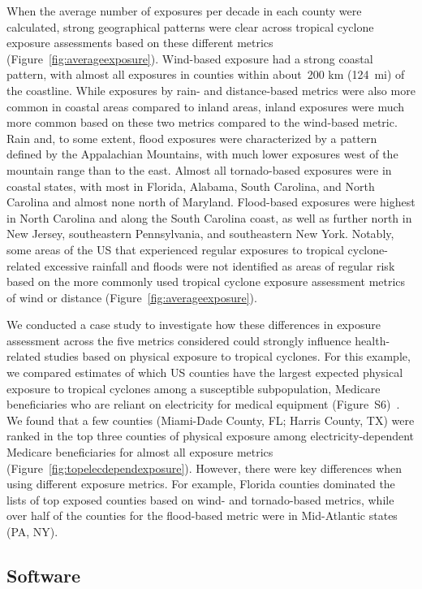 When the average number of exposures per decade in each county were calculated,
strong geographical patterns were clear across tropical cyclone exposure
assessments based on these different metrics
(Figure~\ref{fig:averageexposure}). Wind-based exposure had a strong coastal
pattern, with almost all exposures in counties within about~200
\si{\kilo\metre} (124~mi) of the coastline. While exposures by rain- and
distance-based metrics were also more common in coastal areas compared to
inland areas, inland exposures were much more common based on these two metrics
compared to the wind-based metric. Rain and, to some extent, flood exposures
were characterized by a pattern defined by the Appalachian Mountains, with much
lower exposures west of the mountain range than to the east. Almost all
tornado-based exposures were in coastal states, with most in Florida, Alabama,
South Carolina, and North Carolina and almost none north of Maryland.
Flood-based exposures were highest in North Carolina and along the South
Carolina coast, as well as further north in New Jersey, southeastern
Pennsylvania, and southeastern New York. Notably, some areas of the \ac{US}
that experienced regular exposures to tropical cyclone-related excessive
rainfall and floods were not identified as areas of regular risk based on the
more commonly used tropical cyclone exposure assessment metrics of wind or
distance (Figure~\ref{fig:averageexposure}). 

We conducted a case study to investigate how these differences in exposure
assessment across the five metrics considered could strongly influence
health-related studies based on physical exposure to tropical cyclones. For
this example, we compared estimates of which \ac{US} counties have the largest
expected physical exposure to tropical cyclones among a susceptible
subpopulation, Medicare beneficiaries who are reliant on electricity for
medical equipment (Figure~S6)~\parencite{empower}.  We
found that a few counties (Miami-Dade County, FL; Harris County, TX) were
ranked in the top three counties of physical exposure among
electricity-dependent Medicare beneficiaries for almost all exposure metrics
(Figure~\ref{fig:topelecdependexposure}). However, there were key differences
when using different exposure metrics. For example, Florida counties dominated
the lists of top exposed counties based on wind- and tornado-based metrics,
while over half of the counties for the flood-based metric were in Mid-Atlantic
states (PA, NY).

\subsection*{Software}

